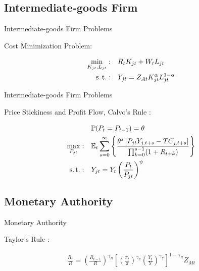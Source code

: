 \documentclass[
presentation.tex
]{subfiles}
\begin{document}

\subsection{Intermediate-goods Firm}

	\begin{frame}{Intermediate-goods Firm Problems}
		
	Cost Minimization Problem:	
	
	\begin{align}
		\label{eq:int-good-firm-total-cost}
		\min_{K_{jt}, L_{jt}}: \quad & R_t K_{jt} + W_t L_{jt} \\
		\label{eq:int-good-firm-production-function}
		\operatorname{s.t.}: \quad & Y_{jt} = Z_{At} K_{jt}^\alpha L_{jt}^{1-\alpha}
	\end{align}	
				
	\end{frame}


\begin{frame}{Intermediate-goods Firm Problems}
	
	Price Stickiness and Profit Flow, Calvo's Rule \cite{calvo_staggered_1983}:
	
	\begin{align}
		& \quad \mathbb{P}(P_t=P_{t-1})=\theta \\
		\max_{P_{jt}}: & \quad \E \sum_{s=0}^{\infty} \left\{ \frac{ \theta^s \left[ P_{jt} Y_{j,t+s} - TC_{j,t+s} \right] }{\prod_{k=0}^{s-1}(1+R_{t+k})} \right\} \label{eq:int-good-firm-optimal-price-problem} \\
		\st: & \quad Y_{jt} = Y_t \left( \frac{P_t}{P_{jt}} \right)^{\psi} %
	\end{align}	
	
\end{frame}


\subsection{Monetary Authority}

\begin{frame}{Monetary Authority}
	
	Taylor's Rule \cite{taylor_discretion_1993}:
	
	\begin{align}
		\label{eq:monetary-policy}
		\frac{R_t}{R} =
		\left( \frac{R_{t-1}}{R} \right)^{\gamma_R}  \left[
		\left( \frac{\pi_t}{\pi} \right)^{\gamma_\pi}
		\left( \frac{Y_t}{Y} \right)^{\gamma_Y} \right]^{1-\gamma_R} Z_{Mt}
	\end{align}	
	
	
\end{frame}
\end{document}

